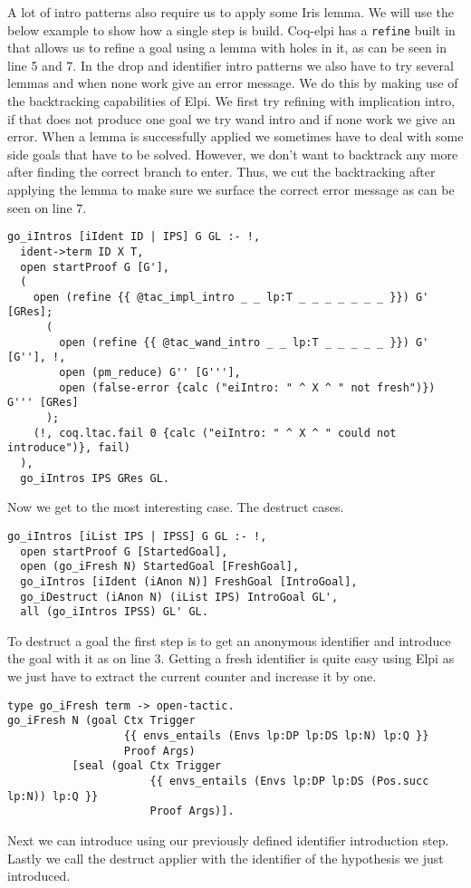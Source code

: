 \documentclass[thesis.tex]{subfiles}
\begin{document}
{{A lot of intro patterns also require us to apply some Iris lemma. We will use the below example to show how a single step is build. Coq-elpi has a \texttt{refine} built in that allows us to refine a goal using a lemma with holes in it, as can be seen in line 5 and 7. In the drop and identifier intro patterns we also have to try several lemmas and when none work give an error message. We do this by making use of the backtracking capabilities of Elpi. We first try refining with implication intro, if that does not produce one goal we try wand intro and if none work we give an error. When a lemma is successfully applied we sometimes have to deal with some side goals that have to be solved. However, we don't want to backtrack any more after finding the correct branch to enter. Thus, we cut the backtracking after applying the lemma to make sure we surface the correct error message as can be seen on line 7.
\begin{verbatim}
go_iIntros [iIdent ID | IPS] G GL :- !,
  ident->term ID X T,
  open startProof G [G'],
  (
    open (refine {{ @tac_impl_intro _ _ lp:T _ _ _ _ _ _ _ }}) G' [GRes];
      (
        open (refine {{ @tac_wand_intro _ _ lp:T _ _ _ _ _ }}) G' [G''], !,
        open (pm_reduce) G'' [G'''],
        open (false-error {calc ("eiIntro: " ^ X ^ " not fresh")}) G''' [GRes]
      );
    (!, coq.ltac.fail 0 {calc ("eiIntro: " ^ X ^ " could not introduce")}, fail)
  ),
  go_iIntros IPS GRes GL.
\end{verbatim}

Now we get to the most interesting case. The destruct cases.
\begin{verbatim}
go_iIntros [iList IPS | IPSS] G GL :- !,
  open startProof G [StartedGoal],
  open (go_iFresh N) StartedGoal [FreshGoal],
  go_iIntros [iIdent (iAnon N)] FreshGoal [IntroGoal],
  go_iDestruct (iAnon N) (iList IPS) IntroGoal GL',
  all (go_iIntros IPSS) GL' GL.
\end{verbatim}
To destruct a goal the first step is to get an anonymous identifier and introduce the goal with it as on line 3. Getting a fresh identifier is quite easy using Elpi as we just have to extract the current counter and increase it by one.
\begin{verbatim}
type go_iFresh term -> open-tactic.
go_iFresh N (goal Ctx Trigger 
                  {{ envs_entails (Envs lp:DP lp:DS lp:N) lp:Q }} 
                  Proof Args) 
          [seal (goal Ctx Trigger 
                      {{ envs_entails (Envs lp:DP lp:DS (Pos.succ lp:N)) lp:Q }} 
                      Proof Args)].
\end{verbatim}
Next we can introduce using our previously defined identifier introduction step. Lastly we call the destruct applier with the identifier of the hypothesis we just introduced.

}}
\end{document}
